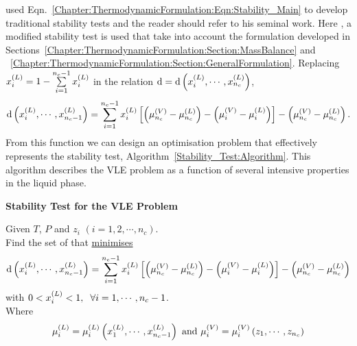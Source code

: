 \citet{michelsen_1984} used Eqn.~\ref{Chapter:ThermodynamicFormulation:Eqn:Stability_Main} to develop traditional stability tests and the reader should refer to his seminal work. Here \citep[see][]{Henderson_Thesis}, a modified stability test is used that take into account the formulation developed in Sections~\ref{Chapter:ThermodynamicFormulation:Section:MassBalance} and ~\ref{Chapter:ThermodynamicFormulation:Section:GeneralFormulation}.  Replacing $\mfr[x]{i}{L} = 1 - \summation_{i=1}^{n_{c}-1}\mfr[x]{i}{L}$ in the relation $\d=\d\left(\mfr[x]{i}{L}, \cdots, \mfr[x]{n_{c}}{L}\right)$,
\begin{equation}
   \d\left(\mfr[x]{i}{L}, \cdots, \mfr[x]{n_{c}-1}{L}\right) = \summation_{i=1}^{n_{c}-1}\mfr[x]{i}{L}\left[\left(\mfr[\mu]{n_{c}}{V}-\mfr[\mu]{n_{c}}{L}\right)-\left(\mfr[\mu]{i}{V}-\mfr[\mu]{i}{L}\right)\right] - \left(\mfr[\mu]{n_{c}}{V}-\mfr[\mu]{n_{c}}{L}\right).
\end{equation}
From this function we can design an optimisation problem that effectively represents the stability test, Algorithm~\ref{Stability_Test:Algorithm}. This algorithm describes the VLE problem as a function of several intensive properties in the liquid phase.  
\begin{algorithm}[h]
\begin{shaded}
   \begin{center}
     {\bf Stability Test for the VLE Problem}
   \end{center}

   Given $T$, $P$ and $z_{i}$ $\left(i=1,2,\cdots,n_{c}\right)$. \\
   Find the set of  that \underline{minimises}
   \begin{displaymath}
        \d\left(\mfr[x]{i}{L}, \cdots, \mfr[x]{n_{c}-1}{L}\right) = \summation_{i=1}^{n_{c}-1}\mfr[x]{i}{L}\left[\left(\mfr[\mu]{n_{c}}{V}-\mfr[\mu]{n_{c}}{L}\right)-\left(\mfr[\mu]{i}{V}-\mfr[\mu]{i}{L}\right)\right] - \left(\mfr[\mu]{n_{c}}{V}-\mfr[\mu]{n_{c}}{L}\right)
   \end{displaymath} 
   with $0<\mfr[x]{i}{L}<1,\hspace{.2cm} \forall i=1,\cdots,n_{c}-1$. \\
   Where
   \begin{displaymath}
      \mfr[\mu]{i}{L} = \mfr[\mu]{i}{L} \left(\mfr[x]{1}{L},\cdots,\mfr[x]{n_{c}-1}{L}\right)\text{ and } \mfr[\mu]{i}{V} = \mfr[\mu]{i}{V} \left(z_{1},\cdots, z_{n_{c}}\right)
   \end{displaymath}

\end{shaded}
\label{Stability_Test:Algorithm}\caption{Modified stability test for the VLE problem.}
\end{algorithm}
